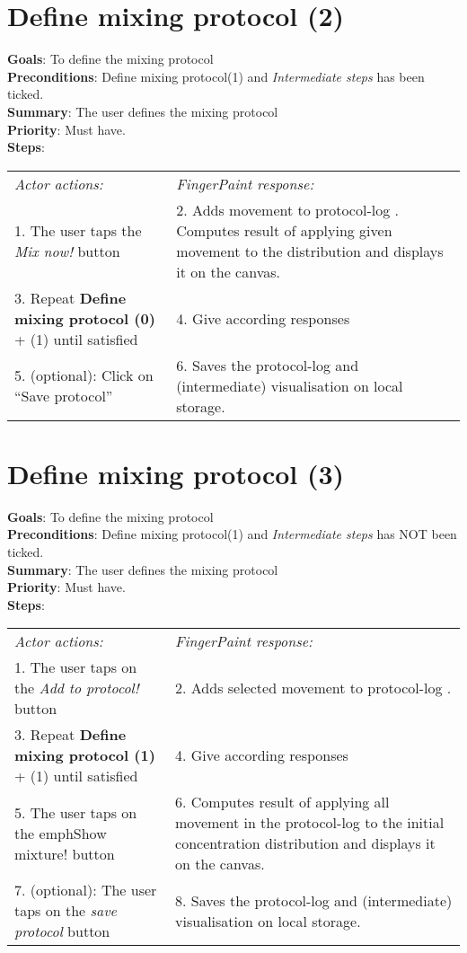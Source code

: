 \begin{appendices}
  \section{Define mixing protocol (2)}
  \textbf{Goals}: To define the mixing protocol\\
  \textbf{Preconditions}: Define mixing protocol(1) and \emph{Intermediate steps} has been ticked.\\
  \textbf{Summary}: The user defines the mixing protocol\\
  \textbf{Priority}: Must have.\\
  \textbf{Steps}: \\
  \begin{tabular}{ p{} p{} }
  	\emph{Actor actions:} & \emph{FingerPaint response:} \\
    1. The user taps the \emph{Mix now!} button & 2.	Adds movement to protocol-log . Computes result of applying given movement to the distribution and displays it on the canvas.\\
    3.	Repeat \textbf{Define mixing protocol (0)} + (1) until satisfied & 4.	Give according responses\\
    5.	(optional): Click on “Save protocol” & 6.	Saves the protocol-log and (intermediate) visualisation on local storage.\\
  \end{tabular}

 \section{Define mixing protocol (3)}
  \textbf{Goals}: To define the mixing protocol\\
  \textbf{Preconditions}: Define mixing protocol(1) and \emph{Intermediate steps} has NOT been ticked.\\
  \textbf{Summary}: The user defines the mixing protocol\\
  \textbf{Priority}: Must have.\\
  \textbf{Steps}: \\
  \begin{tabular}{ p{} p{} }
  	\emph{Actor actions:} & \emph{FingerPaint response:} \\
    1.	The user taps on  the \emph{Add to protocol!} button	& 2.	Adds selected movement to protocol-log . \\
    3.	Repeat \textbf{Define mixing protocol (1)} + (1) until satisfied	& 4.	Give according responses\\
    5.	The user taps on the emph{Show mixture!} button	& 6.	Computes result of applying all movement in the protocol-log to the initial concentration distribution and displays it on the canvas.\\
    7.	(optional): The user taps on the \emph{save protocol} button & 8.	Saves the protocol-log and (intermediate) visualisation on local storage.\\
  \end{tabular}
\end{appendices}
